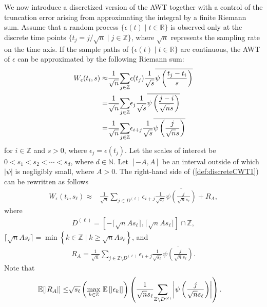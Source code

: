 \documentclass{amsart}
\begin{document}
We now introduce a discretized version of the AWT together with a control of the truncation error arising from approximating the integral by a finite Riemann sum.
Assume that a random process $\{\epsilon(t)\mid t\in \mathbb{R}\}$ is observed only at the discrete time points $\{t_{j}=j/\sqrt{n}\mid j\in \mathbb{Z}\}$, where $\sqrt{n}$ represents the sampling rate on the time axis.
If the sample paths of $\{\epsilon(t)\mid t\in \mathbb{R}\}$ are continuous, the AWT of $\epsilon$ can be approximated by the following Riemann sum:
\begin{align}\notag
W_{\epsilon}(t_{i},s) \approx&
\frac{1}{\sqrt{n}}\underset{j\in \mathbb{Z}}{\sum}\epsilon(t_{j})\frac{1}{\sqrt{s}}\overline{\psi\left(\frac{t_{j}-t_{i}}{s}\right)}
\\\notag=&\frac{1}{\sqrt{n}}\underset{j\in \mathbb{Z}}{\sum}\epsilon_{j}\frac{1}{\sqrt{s}}\overline{\psi\left(\frac{j-i}{\sqrt{n}s}\right)}
\\\label{def:discreteCWT1}=&
\frac{1}{\sqrt{n}}\underset{j\in \mathbb{Z}}{\sum}\epsilon_{i+j}\frac{1}{\sqrt{s}}\overline{\psi\left(\frac{j}{\sqrt{n}s}\right)}
\end{align}
for $i\in \mathbb{Z}$ and $s>0$, where $\epsilon_{j}=\epsilon(t_{j})$.
Let the scales of interest be $0<s_{1}<s_{2}<\cdots<s_{d}$, where $d\in \mathbb{N}$.
Let $[-A,A]$ be an interval outside of which $|\psi|$ is negligibly small, where $A>0$.
The right-hand side of (\ref{def:discreteCWT1}) can be rewritten as follows
\begin{align}\label{def:discreteCWT1s}
W_{\epsilon}(t_{i},s_{\ell}) \approx&
\frac{1}{\sqrt{n}}\underset{j\in D^{(\ell)}}{\sum}\epsilon_{i+j}\frac{1}{\sqrt{s_{\ell}}}\overline{\psi\left(\frac{j}{\sqrt{n}s_{\ell}}\right)}
+R_{A},
\end{align}
where
\begin{align*}
D^{(\ell)} = \left[-\lceil \sqrt{n}As_{\ell}\rceil,\lceil \sqrt{n}As_{\ell}\rceil\right]\cap \mathbb{Z},
\end{align*}
$\lceil \sqrt{n}As_{\ell} \rceil = \min\left\{k\in \mathbb{Z} \mid k\geq \sqrt{n}As_{\ell}\right\}$, and
\begin{align*}
R_{A}=\frac{1}{\sqrt{n}}\underset{j\in  \mathbb{Z} \setminus D^{(\ell)}}{\sum}\epsilon_{i+j}\frac{1}{\sqrt{s_{\ell}}}\overline{\psi\left(\frac{j}{\sqrt{n}s_{\ell}}\right)}.
\end{align*}
Note that
\begin{align}\notag
\mathbb{E}[|R_{A}|]\leq&
\sqrt{s_{\ell}}\left(\underset{k\in \mathbb{Z}}{\max}\ \mathbb{E}\left[|\epsilon_{k}|\right]\right)
\left(\frac{1}{\sqrt{n} s_{\ell}}\underset{\mathbb{Z} \setminus D^{(\ell)}}{\sum}\left|\psi\left(\frac{j}{\sqrt{n}s_{\ell}}\right)\right|\right).
\end{align}
\end{document}
